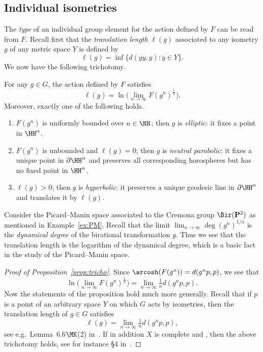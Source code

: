 \subsection{Individual isometries}

The \emph{type} of an individual group element for the action defined by $F$ can be read from $F$. Recall first that the \emph{translation length} $\ell(g)$ associated to any isometry $g$ of any metric space $Y$ is defined by
\[
\ell(g) = \inf \big\{d(g y, y) : y\in Y\big\}.
\]
We now have the following trichotomy.

\begin{prop}\label{prop:tricho}
For any $g\in G$, the action defined by $F$ satisfies
\[
\ell(g) = \ln \Big(\lim_{n\to\infty} F(g^n)^{\frac1n} \Big).
\]
Moreover, exactly one of the following holds.
\begin{enumerate}
\item $F(g^n)$ is uniformly bounded over $n\in\NN$; then $g$ is \emph{elliptic}: it fixes a point in $\HH^\alpha$.\label{pt:elliptic}
\item $F(g^n)$ is unbounded and $\ell(g)=0$; then $g$ is \emph{neutral parabolic}: it fixes a unique point in $\partial \HH^\alpha$ and preserves all corresponding horospheres but has no fixed point in $\HH^\alpha$.\label{pt:parabolic}
\item $\ell(g)>0$; then $g$ is \emph{hyperbolic}: it preserves a unique geodesic line in $\partial \HH^\alpha$ and translates it by $\ell(g)$.\label{pt:hyperbolic}
\end{enumerate}
\end{prop}

\begin{rema}
Consider the Picard--Manin space associated to the Cremona group $\Bir(\mathbf{P}^{2})$ as mentioned in Example~\ref{ex:PM}. Recall that the limit $\lim_{n\to\infty} \deg(g^n)^{1/n}$ is the \emph{dynamical degree} of the birational transformation $g$. Thus we see that the translation length is the logarithm of the dynamical degree, which is a basic fact in the study of the Picard--Manin space.
\end{rema}

\begin{proof}[Proof of Proposition~\ref{prop:tricho}]
Since $\arcosh (F(g^n)) = d(g^n p, p)$, we see that
\[
\ln \Big(\lim_{n\to\infty} F(g^n)^{\frac1n} \Big) = \lim_{n\to\infty} \tfrac1n d(g^n p, p).
\]
Now the statements of the proposition hold much more generally. Recall that if $p$ is a point of an arbitrary  space $Y$ on which $G$ acts by isometries, then the translation length of $g\in G$ satisfies
\begin{equation}\label{eq:length}
\ell(g) = \lim_{n\to\infty} \tfrac1n d(g^n p, p),
\end{equation}
see e.g.~Lemma~6.6$\MK$(2) in~\cite{Ballmann-Gromov-Schroeder}. If in addition $X$ is complete and , then the above trichotomy holds, see for instance \S4 in~\cite{Burger-Iozzi-Monod}.
\end{proof}


